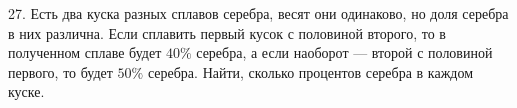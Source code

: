 27. Есть два куска разных сплавов серебра, весят они одинаково, но доля серебра в них различна. Если сплавить первый кусок с половиной второго, то в полученном сплаве будет
$40\%$ серебра, а если наоборот --- второй с половиной первого, то будет $50\%$ серебра. Найти, сколько процентов серебра в каждом куске.\\
